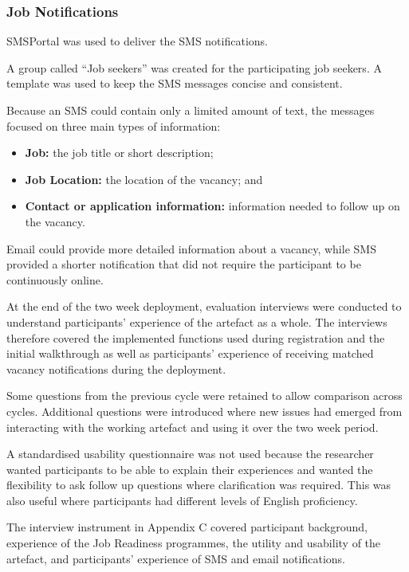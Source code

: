 \subsubsection{Job Notifications}

SMSPortal was used to deliver the SMS notifications.

A group called ``Job seekers'' was created for the participating job seekers. A template was used to keep the SMS messages concise and consistent.

Because an SMS could contain only a limited amount of text, the messages focused on three main types of information:

\begin{itemize}
    \item \textbf{Job:} the job title or short description;
    \item \textbf{Job Location:} the location of the vacancy; and
    \item \textbf{Contact or application information:} information needed to follow up on the vacancy.
\end{itemize}

Email could provide more detailed information about a vacancy, while SMS provided a shorter notification that did not require the participant to be continuously online.


At the end of the two week deployment, evaluation interviews were conducted to understand participants' experience of the artefact as a whole. The interviews therefore covered the implemented functions used during registration and the initial walkthrough as well as participants' experience of receiving matched vacancy notifications during the deployment.

Some questions from the previous cycle were retained to allow comparison across cycles. Additional questions were introduced where new issues had emerged from interacting with the working artefact and using it over the two week period.

A standardised usability questionnaire was not used because the researcher wanted participants to be able to explain their experiences and wanted the flexibility to ask follow up questions where clarification was required. This was also useful where participants had different levels of English proficiency.

The interview instrument in Appendix C covered participant background, experience of the Job Readiness programmes, the utility and usability of the artefact, and participants' experience of SMS and email notifications.

